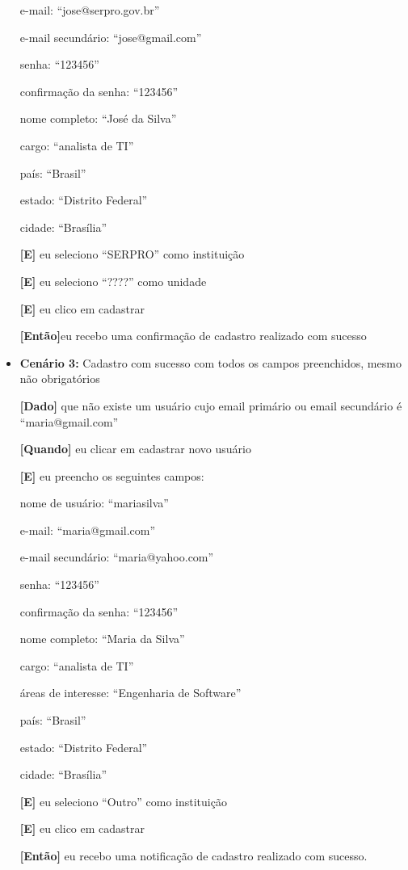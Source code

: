 \begin{itemize}
  		\subitem e-mail: ``jose@serpro.gov.br''

  		\subitem e-mail secundário: ``jose@gmail.com''

  		\subitem senha: ``123456''

		\subitem confirmação da senha: ``123456''

		\subitem nome completo: ``José da Silva''

		\subitem cargo: ``analista de TI''

		\subitem país: ``Brasil''

		 \subitem estado: ``Distrito Federal''

		\subitem cidade: ``Brasília''

	\textbf{[E]} eu seleciono ``SERPRO'' como instituição

	\textbf{[E]} eu seleciono ``????'' como unidade  

	\textbf{[E]} eu clico em cadastrar

	\textbf{[Então]}eu recebo uma confirmação de cadastro realizado com sucesso

\item\textbf{Cenário 3:} Cadastro com sucesso com todos os campos preenchidos, mesmo não obrigatórios

	\textbf{[Dado]} que não existe um usuário cujo email primário ou email secundário é ``maria@gmail.com''

	\textbf{[Quando]} eu clicar em cadastrar novo usuário

	\textbf{[E]} eu preencho os seguintes campos: 

  		\subitem nome de usuário: ``mariasilva''

		  \subitem e-mail: ``maria@gmail.com''

		  \subitem e-mail secundário: ``maria@yahoo.com''

		  \subitem senha: ``123456''

		  \subitem confirmação da senha: ``123456''

		  \subitem nome completo: ``Maria da Silva''

		  \subitem cargo: ``analista de TI''

		  \subitem áreas de interesse: ``Engenharia de Software''

		  \subitem país: ``Brasil''

		  \subitem estado: ``Distrito Federal''

		  \subitem cidade: ``Brasília''

	\textbf{[E]} eu seleciono ``Outro'' como instituição 

	\textbf{[E]} eu clico em cadastrar

	\textbf{[Então]} eu recebo uma notificação de cadastro realizado com sucesso.
	\end{itemize}

